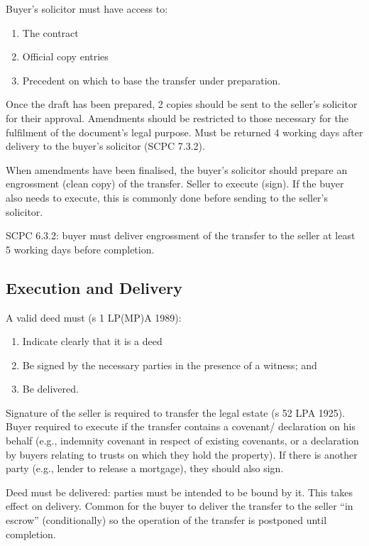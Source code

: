 \documentclass[
]{article}
\providecommand{\tightlist}{%
  \setlength{\itemsep}{0pt}\setlength{\parskip}{0pt}}
\begin{document}
Buyer's solicitor must have access to:

\begin{enumerate}
\def\labelenumi{\arabic{enumi}.}
\tightlist
\item
  The contract
\item
  Official copy entries
\item
  Precedent on which to base the transfer under preparation.
\end{enumerate}

Once the draft has been prepared, 2 copies should be sent to the
seller's solicitor for their approval. Amendments should be restricted
to those necessary for the fulfilment of the document's legal purpose.
Must be returned 4 working days after delivery to the buyer's solicitor
(SCPC 7.3.2).

When amendments have been finalised, the buyer's solicitor should
prepare an engrossment (clean copy) of the transfer. Seller to execute
(sign). If the buyer also needs to execute, this is commonly done before
sending to the seller's solicitor.

SCPC 6.3.2: buyer must deliver engrossment of the transfer to the seller
at least 5 working days before completion.

\hypertarget{execution-and-delivery}{%
\subsection{Execution and Delivery}\label{execution-and-delivery}}

A valid deed must (s 1 LP(MP)A 1989):

\begin{enumerate}
\def\labelenumi{\arabic{enumi}.}
\tightlist
\item
  Indicate clearly that it is a deed
\item
  Be signed by the necessary parties in the presence of a witness; and
\item
  Be delivered.
\end{enumerate}

Signature of the seller is required to transfer the legal estate (s 52
LPA 1925). Buyer required to execute if the transfer contains a
covenant/ declaration on his behalf (e.g., indemnity covenant in respect
of existing covenants, or a declaration by buyers relating to trusts on
which they hold the property). If there is another party (e.g., lender
to release a mortgage), they should also sign.

Deed must be delivered: parties must be intended to be bound by it. This
takes effect on delivery. Common for the buyer to deliver the transfer
to the seller ``in escrow'' (conditionally) so the operation of the
transfer is postponed until completion.
\end{document}

